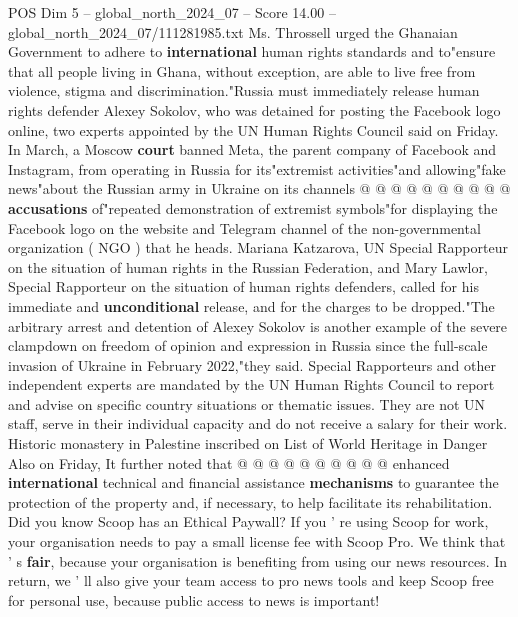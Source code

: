 \begin{textsample}{POS Dim 5 – global\_north\_2024\_07 – Score 14.00 – global\_north\_2024\_07/111281985.txt}
Ms.
Throssell urged the Ghanaian Government to adhere to \textbf{international} human rights standards and to"ensure that all people living in Ghana, without exception, are able to live free from violence, stigma and discrimination."Russia must immediately release human rights defender Alexey Sokolov, who was detained for posting the Facebook logo online, two experts appointed by the UN Human Rights Council said on Friday.
In March, a Moscow \textbf{court} banned Meta, the parent company of Facebook and Instagram, from operating in Russia for its"extremist activities"and allowing"fake news"about the Russian army in Ukraine on its channels @ @ @ @ @ @ @ @ @ @ \textbf{accusations} of"repeated demonstration of extremist symbols"for displaying the Facebook logo on the website and Telegram channel of the non-governmental organization ( NGO ) that he heads.
Mariana Katzarova, UN Special Rapporteur on the situation of human rights in the Russian Federation, and Mary Lawlor, Special Rapporteur on the situation of human rights defenders, called for his immediate and \textbf{unconditional} release, and for the charges to be dropped."The arbitrary arrest and detention of Alexey Sokolov is another example of the severe clampdown on freedom of opinion and expression in Russia since the full-scale invasion of Ukraine in February 2022,"they said.
Special Rapporteurs and other independent experts are mandated by the UN Human Rights Council to report and advise on specific country situations or thematic issues.
They are not UN staff, serve in their individual capacity and do not receive a salary for their work.
Historic monastery in Palestine inscribed on List of World Heritage in Danger Also on Friday, It further noted that @ @ @ @ @ @ @ @ @ @ enhanced \textbf{international} technical and financial assistance \textbf{mechanisms} to guarantee the protection of the property and, if necessary, to help facilitate its rehabilitation.
Did you know Scoop has an Ethical Paywall?
If you ' re using Scoop for work, your organisation needs to pay a small license fee with Scoop Pro.
We think that ' s \textbf{fair}, because your organisation is benefiting from using our news resources.
In return, we ' ll also give your team access to pro news tools and keep Scoop free for personal use, because public access to news is important!

\end{textsample}
